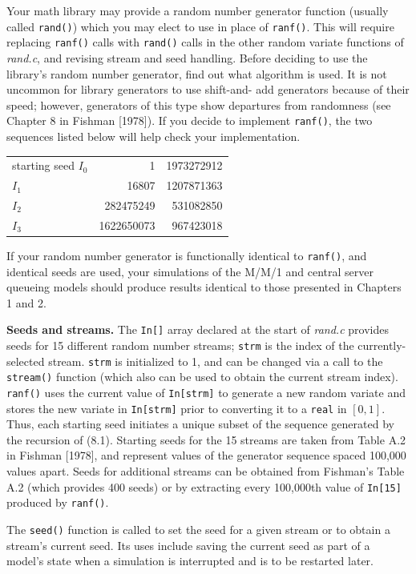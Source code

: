 Your math library may provide a random number generator function
(usually called \texttt{rand()}) which you may elect to use in place of \texttt{ranf()}.
This will require replacing \texttt{ranf()} calls with \texttt{rand()} calls in the other random
variate functions of \textit{rand.c}, and revising stream and seed handling.
Before deciding to use the library's random number generator, find out what
algorithm is used. It is not uncommon for library generators to use shift-and-
add generators because of their speed; however, generators of this type show
departures from randomness (see Chapter 8 in Fishman [1978]). If you decide
to implement \texttt{ranf()}, the two sequences listed below will help check your
implementation.
\begin{center}
\begin{tabular}{lrr}
starting seed $I_0$ & 1 & 1973272912\\
$I_1$ & 16807 & 1207871363\\
$I_2$ & 282475249 & 531082850\\
$I_3$ & 1622650073 & 967423018
\end{tabular}
\end{center}
If your random number generator is functionally identical to \texttt{ranf()}, and
identical seeds are used, your simulations of the M/M/1 and central server
queueing models should produce results identical to those presented in
Chapters 1 and 2.


\textbf{Seeds and streams.} The \texttt{In[]} array declared at the start of \textit{rand.c}
provides seeds for 15 different random number streams; \texttt{strm} is the index of
the currently-selected stream. \texttt{strm} is initialized to 1, and can be changed
via a call to the \texttt{stream()} function (which also can be used to obtain the
current stream index). \texttt{ranf()} uses the current value of \texttt{In[strm]} to
generate a new random variate and stores the new variate in \texttt{In[strm]} prior
to converting it to a \texttt{real} in $[0,1]$. Thus, each starting seed initiates a unique
subset of the sequence generated by the recursion of (8.1). Starting seeds for
the 15 streams are taken from Table A.2 in Fishman [1978], and represent
values of the generator sequence spaced 100,000 values apart. Seeds for
additional streams can be obtained from Fishman's Table A.2 (which
provides 400 seeds) or by extracting every 100,000th value of \texttt{In[15]}
produced by \texttt{ranf()}.

The \texttt{seed()} function is called to set the seed for a given stream or to
obtain a stream's current seed. Its uses include saving the current seed as part
of a model's state when a simulation is interrupted and is to be restarted
later.

